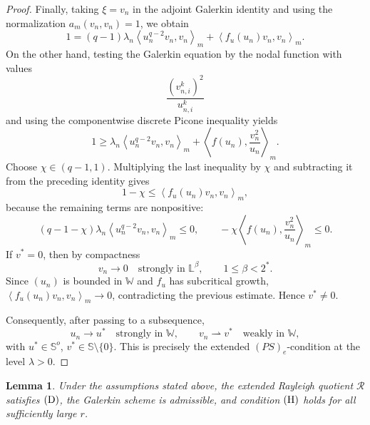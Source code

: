 \documentclass[preprint,10pt]{elsarticle}
\numberwithin{equation}{section}
\newtheorem{lem}[thm]{Lemma}
\begin{document}
\begin{proof}
	Finally, taking \(\xi=v_n\) in the adjoint Galerkin identity and using the
	normalization \(a_m(v_n,v_n)=1\), we obtain
	\[
	1
	=
	(q-1)\lambda_n
	\left\langle u_n^{q-2}v_n,v_n\right\rangle_m
	+
	\left\langle f_u(u_n)v_n,v_n\right\rangle_m .
	\]
	On the other hand, testing the Galerkin equation by the nodal function with
	values
	\[
	\frac{(v_{n,i}^k)^2}{u_{n,i}^k}
	\]
	and using the componentwise discrete Picone inequality yields
	\[
	1
	\ge
	\lambda_n
	\left\langle u_n^{q-2}v_n,v_n\right\rangle_m
	+
	\left\langle f(u_n),\frac{v_n^2}{u_n}\right\rangle_m .
	\]
	Choose \(\chi\in(q-1,1)\). Multiplying the last inequality by \(\chi\) and
	subtracting it from the preceding identity gives
	\[
	1-\chi
	\le
	\left\langle f_u(u_n)v_n,v_n\right\rangle_m ,
	\]
	because the remaining terms are nonpositive:
	\[
	(q-1-\chi)\lambda_n
	\left\langle u_n^{q-2}v_n,v_n\right\rangle_m\le0,
	\qquad
	-\chi
	\left\langle f(u_n),\frac{v_n^2}{u_n}\right\rangle_m\le0 .
	\]
	If \(v^*=0\), then by compactness
	\[
	v_n\to0
	\quad\text{strongly in }\mathbb L^\beta,\qquad 1\le\beta<2^* .
	\]
	Since \((u_n)\) is bounded in \(\mathbb W\) and \(f_u\) has subcritical
	growth, \(\left\langle f_u(u_n)v_n,v_n\right\rangle_m\to0\),
	contradicting the previous estimate. Hence \(v^*\ne0\).
	
	Consequently, after passing to a subsequence,
	\[
	u_n\to u^*
	\quad\text{strongly in }\mathbb W,
	\qquad
	v_n\rightharpoonup v^*
	\quad\text{weakly in }\mathbb W,
	\]
	with \(u^*\in\mathbb S^o\), \(v^*\in\mathbb S\setminus\{0\}\). This is
	precisely the extended \((PS)_e\)-condition at the level \(\lambda>0\).
\end{proof}

\begin{lem}\label{lem:verification-system}
	Under the assumptions stated above, the extended Rayleigh quotient
	\(\mathcal R\) satisfies \({\rm (D)}\), the Galerkin scheme is admissible,
	and condition \({\rm (H)}\) holds for all sufficiently large \(r\).
\end{lem}
\end{document}
